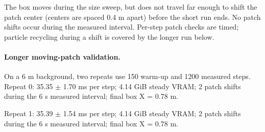 \documentclass[10pt]{article}
\begin{document}
The box moves during the size sweep, but does not travel far enough to shift the patch center (centers are spaced 0.4 m apart) before the short run ends. No patch shifts occur during the measured interval. Per-step patch checks are timed; particle recycling during a shift is covered by the longer run below.

\paragraph{Longer moving-patch validation.}
On a 6 m background, two repeats use 150 warm-up and 1200 measured steps. Repeat 0: 35.35 $\pm$ 1.70 ms per step; 4.14 GiB steady VRAM; 2 patch shifts during the 6 s measured interval; final box X = 0.78 m.

Repeat 1: 35.39 $\pm$ 1.54 ms per step; 4.14 GiB steady VRAM; 2 patch shifts during the 6 s measured interval; final box X = 0.78 m.
\end{document}
